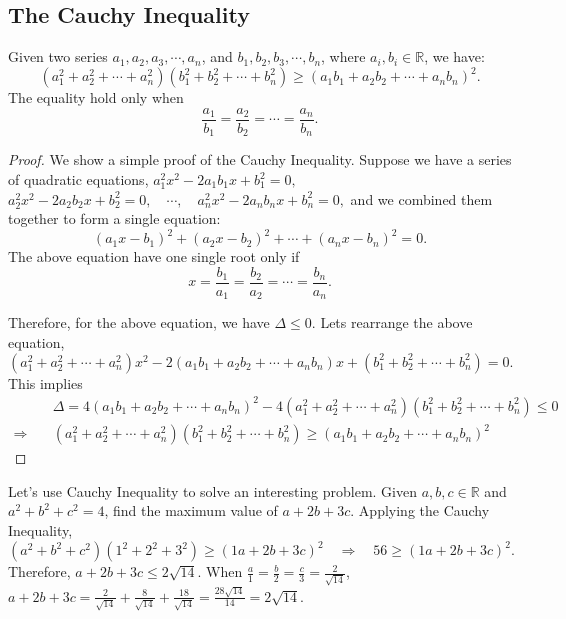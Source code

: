 \documentclass[11pt, oneside]{article}   	%
\begin{document}
\subsection{The Cauchy Inequality} 
Given two series $a_1, a_2, a_3, \cdots, a_n$, and  $b_1, b_2, b_3, \cdots, b_n$, where $a_i, b_i \in \mathbb{R}$, we have: 
\[ (a_1^2 + a_2^2 + \cdots + a_n^2)(b_1^2 + b_2^2 + \cdots + b_n^2) \ge (a_1b_1 + a_2b_2 + \cdots+ a_nb_n)^2. \] 
The equality hold only when 
\[ \frac{a_1}{b_1} = \frac{a_2}{b_2} = \cdots = \frac{a_n}{b_n} .\]

\begin{proof}
We show a simple proof of the Cauchy Inequality. 
Suppose we have a series of quadratic equations, $a_1^2 x^2 - 2a_1 b_1 x + b_1^2 = 0, \quad$
$a_2^2 x^2 - 2a_2b_2 x + b_2^2 = 0, \quad \cdots, \quad a_n^2 x^2 - 2a_n b_n x + b_n^2 = 0,$ and we combined them together to form a single equation:  
\[ (a_1x - b_1)^2 + (a_2x - b_2)^2 + \cdots +  (a_nx - b_n)^2 = 0. \] 
The above equation have one single root only if 
\[ x= \frac{b_1}{a_1} = \frac{b_2}{a_2} = \cdots = \frac{b_n}{a_n} .\]

Therefore, for the above equation, we have $\Delta \le 0$. Lets rearrange the above equation, 
\[ (a_1^2 + a_2^2 + \cdots + a_n^2)x^2 - 2(a_1b_1+a_2b_2+\cdots+a_nb_n)x + (b_1^2+b_2^2+\cdots+b_n^2) = 0.\]
This implies 
\begin{align*}
& \Delta = 4(a_1b_1+a_2b_2+\cdots+a_nb_n)^2 - 4 (a_1^2 + a_2^2 + \cdots + a_n^2) (b_1^2+b_2^2+\cdots+b_n^2) \le 0\\
\Rightarrow \quad & (a_1^2 + a_2^2 + \cdots + a_n^2) (b_1^2+b_2^2+\cdots+b_n^2) \ge (a_1b_1+a_2b_2+\cdots+a_nb_n)^2
\end{align*}
\end{proof} 
Let's use Cauchy Inequality to solve an interesting problem. Given $a, b, c \in \mathbb{R}$ and $a^2 + b^2 + c^2 = 4$, find the maximum value of $a + 2b + 3c$. Applying the Cauchy Inequality, 
\[ (a^2 + b^2 + c^2)(1^2+2^2+3^2) \ge (1a + 2b + 3c)^2 \quad \Rightarrow \quad 56 \ge (1a + 2b + 3c)^2. \]
Therefore, $a+2b+3c \le 2\sqrt{14}$. When $\frac{a}{1} = \frac{b}{2} = \frac{c}{3} = \frac{2}{\sqrt{14}}$, $a+2b+3c= \frac{2}{\sqrt{14}} + \frac{8}{\sqrt{14}} + \frac{18}{\sqrt{14}} = \frac{28 \sqrt{14}}{14} = 2 \sqrt{14}$. 


\newpage 
\end{document}
